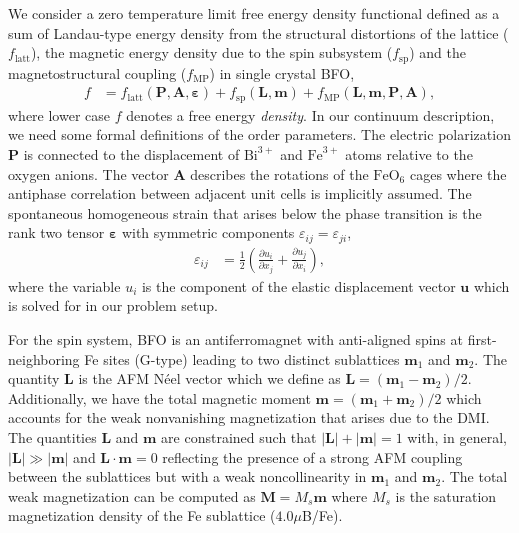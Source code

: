 \documentclass[%
 reprint,
superscriptaddress,
 amsmath,amssymb,
prb,
]{revtex4-1}
\begin{document}
%
We consider a zero temperature limit free energy density functional defined as a sum of Landau-type energy density from the structural distortions of the lattice ($f_\mathrm{latt}$), the magnetic energy density due to the spin subsystem ($f_\mathrm{sp}$) and the magnetostructural coupling ($f_\mathrm{MP}$) in single crystal BFO,
%
\begin{align}\label{eqn:en_sum}
    f &= f_\mathrm{latt}(\mathbf{P},\mathbf{A},\bm{\varepsilon}) + f_\mathrm{sp}(\mathbf{L},\mathbf{m}) + f_\mathrm{MP}(\mathbf{L},\mathbf{m}, \mathbf{P},\mathbf{A}),
\end{align}
%
where lower case $f$ denotes a free energy \emph{density}.
%
In our continuum description, we need some formal definitions of the order parameters. 
%
The electric polarization $\mathbf{P}$ is connected to the displacement of $\mathrm{Bi}^{3+}$ and $\mathrm{Fe}^{3+}$ atoms relative to the oxygen anions.
%
The vector $\mathbf{A}$ describes the rotations of the $\mathrm{FeO}_6$ cages where the antiphase correlation between adjacent unit cells is implicitly assumed.
%
%
The spontaneous homogeneous strain that arises below the phase transition is the rank two tensor $\bm{\varepsilon}$ with symmetric components $\varepsilon_{ij} = \varepsilon_{ji}$,
%
\begin{align}\label{eqn:strain}
    \varepsilon_{ij} &= \frac{1}{2} \left(\frac{\partial u_i}{\partial x_j} + \frac{\partial u_j}{\partial x_i}\right),
\end{align}
%
where the variable $u_i$ is the component of the elastic displacement vector $\mathbf{u}$ which is solved for in our problem setup.
%

%
For the spin system, BFO is an antiferromagnet with anti-aligned spins at first-neighboring Fe sites (G-type) leading to two distinct sublattices $\mathbf{m}_1$ and $\mathbf{m}_2$.
%
The quantity $\mathbf{L}$ is the AFM N\'{e}el vector which we define as $\mathbf{L} = (\mathbf{m}_1 - \mathbf{m}_2)/2$. %
%
Additionally, we have the total magnetic moment $\mathbf{m} = (\mathbf{m}_1 + \mathbf{m}_2)/2$ which accounts for the weak nonvanishing magnetization that arises due to the DMI.
%
The quantities $\mathbf{L}$ and $\mathbf{m}$ are constrained such that $|\mathbf{L}| + |\mathbf{m}| = 1$ with, in general, $|\mathbf{L}| \gg |\mathbf{m}|$ and $\mathbf{L}\cdot\mathbf{m} = 0$ reflecting the presence of a strong AFM coupling between the sublattices but with a weak noncollinearity in $\mathbf{m}_1$ and $\mathbf{m}_2$.
%
%
The total weak magnetization can be computed as $\mathbf{M} = M_s \mathbf{m}$ where $M_s$ is the saturation magnetization density of the Fe sublattice ($4.0 \mu$B/Fe)\cite{Weingart2012,Xu2019,Xu2022}.
%
\end{document}
